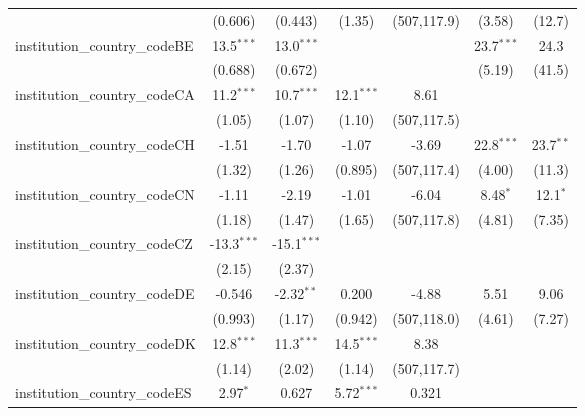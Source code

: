 \begin{tabular}{lcccccc}
                                         & (0.606)       & (0.443)       & (1.35)        & (507,117.9)  & (3.58)        & (12.7)\\   
   institution\_country\_codeBE          & 13.5$^{***}$  & 13.0$^{***}$  &               &              & 23.7$^{***}$  & 24.3\\   
                                         & (0.688)       & (0.672)       &               &              & (5.19)        & (41.5)\\   
   institution\_country\_codeCA          & 11.2$^{***}$  & 10.7$^{***}$  & 12.1$^{***}$  & 8.61         &               &   \\   
                                         & (1.05)        & (1.07)        & (1.10)        & (507,117.5)  &               &   \\   
   institution\_country\_codeCH          & -1.51         & -1.70         & -1.07         & -3.69        & 22.8$^{***}$  & 23.7$^{**}$\\   
                                         & (1.32)        & (1.26)        & (0.895)       & (507,117.4)  & (4.00)        & (11.3)\\   
   institution\_country\_codeCN          & -1.11         & -2.19         & -1.01         & -6.04        & 8.48$^{*}$    & 12.1$^{*}$\\   
                                         & (1.18)        & (1.47)        & (1.65)        & (507,117.8)  & (4.81)        & (7.35)\\   
   institution\_country\_codeCZ          & -13.3$^{***}$ & -15.1$^{***}$ &               &              &               &   \\   
                                         & (2.15)        & (2.37)        &               &              &               &   \\   
   institution\_country\_codeDE          & -0.546        & -2.32$^{**}$  & 0.200         & -4.88        & 5.51          & 9.06\\   
                                         & (0.993)       & (1.17)        & (0.942)       & (507,118.0)  & (4.61)        & (7.27)\\   
   institution\_country\_codeDK          & 12.8$^{***}$  & 11.3$^{***}$  & 14.5$^{***}$  & 8.38         &               &   \\   
                                         & (1.14)        & (2.02)        & (1.14)        & (507,117.7)  &               &   \\   
   institution\_country\_codeES          & 2.97$^{*}$    & 0.627         & 5.72$^{***}$  & 0.321        &               &   \\   

\end{tabular}

